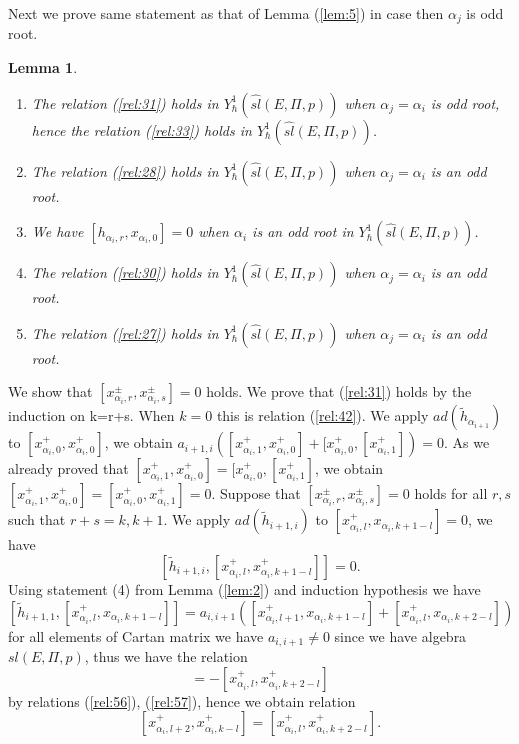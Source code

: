 \documentclass[english]{elsarticle}
\newtheorem{lemma}{Lemma}[section]
\numberwithin{equation}{section}
\begin{document}
Next we prove same statement as that of Lemma (\ref{lem:5}) in case then $\alpha_j$ is odd root.
\begin{lemma}
\label{lem:6}
\begin{enumerate}
\item The relation (\ref{rel:31}) holds in $Y_{\hbar}^1(\hat{sl}(E,\Pi,p))$ when $\alpha_j=\alpha_i$ is odd root, hence the relation (\ref{rel:33}) holds in $Y_{\hbar}^1(\hat{sl}(E,\Pi,p))$.
\item The relation (\ref{rel:28}) holds in $Y_{\hbar}^1(\hat{sl}(E,\Pi,p))$ when $\alpha_j=\alpha_i$ is an odd root.
\item We have $[h_{\alpha_i,r},x_{\alpha_i,0}]=0$ when $\alpha_i$ is an odd root in $Y_{\hbar}^1(\hat{sl}(E,\Pi,p))$.
\item The relation (\ref{rel:30}) holds in $Y_{\hbar}^1(\hat{sl}(E,\Pi,p))$ when $\alpha_j=\alpha_i$ is an odd root.
\item The relation (\ref{rel:27}) holds in $Y_{\hbar}^1(\hat{sl}(E,\Pi,p))$ when $\alpha_j=\alpha_i$ is an odd root.
\end{enumerate}
\end{lemma}

We show that $[x_{\alpha_i,r}^{\pm},x_{\alpha_i,s}^{\pm}]=0$ holds. We prove that (\ref{rel:31}) holds by the induction on k=r+s. When $k=0$ this is relation (\ref{rel:42}). We apply $ad(\tilde{h}_{\alpha_{i+1}})$ to $[x_{\alpha_i,0}^+,x_{\alpha_i,0}^+]$, we obtain $a_{i+1,i}([x_{\alpha_i,1}^+,x_{\alpha_i,0}^+]+[x_{\alpha_i,0}^+,[x_{\alpha_i,1}^+])=0$. As we already proved that $[x_{\alpha_i,1}^+,x_{\alpha_i,0}^+]=[x_{\alpha_i,0}^+,[x_{\alpha_i,1}^+]$, we obtain $[x_{\alpha_i,1}^+,x_{\alpha_i,0}^+]=[x_{\alpha_i,0}^+,x_{\alpha_i,1}^+]=0$.
Suppose that $[x_{\alpha_i,r}^{\pm},x_{\alpha_i,s}^{\pm}]=0$ holds for all $r,s$ such that $r+s=k,k+1$. We apply $ad(\tilde{h}_{i+1,i})$ to $[x_{\alpha_i,l}^+,x_{\alpha_i,k+1-l}]=0$, we have
\begin{equation}
\label{rel:56}
    [\tilde{h}_{i+1,i},[x_{\alpha_i,l}^+,x_{\alpha_i,k+1-l}^{+}]]=0.
\end{equation}
Using statement (4) from Lemma (\ref{lem:2}) and induction hypothesis we have
\begin{equation}
\label{rel:57}
[\tilde{h}_{i+1,1},[x_{\alpha_i,l}^+,x_{\alpha_i,k+1-l}]]=a_{i,i+1}([x_{\alpha_i,l+1}^+,x_{\alpha_i,k+1-l}]+[x_{\alpha_i,l}^+,x_{\alpha_i,k+2-l}])
\end{equation}
for all elements of Cartan matrix we have $a_{i,i+1}\neq 0$ since we have algebra $sl(E,\Pi,p)$, thus we have the relation
\begin{equation}
    [x_{\alpha_i,l+1}^+,x_{\alpha_i,k+1-l}]=-[x_{\alpha_i,l}^+,x_{\alpha_i,k+2-l}^{+}]
\end{equation}
by relations (\ref{rel:56}), (\ref{rel:57}), hence we obtain relation
\begin{equation}
\label{rel:59}
    [x_{\alpha_i,l+2}^+,x_{\alpha_i,k-l}^+]=[x_{\alpha_i,l}^+,x_{\alpha_i,k+2-l}^+].
\end{equation}
\end{document}
